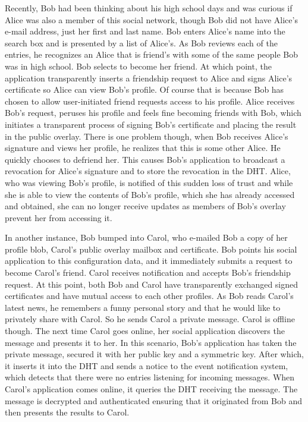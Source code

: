 \documentclass[conference]{IEEEtran}
\begin{document}
Recently, Bob had been thinking about his high school days and was curious if
Alice was also a member of this social network, though Bob did not have Alice's
e-mail address, just her first and last name.  Bob enters Alice's name into the
search box and is presented by a list of Alice's.  As Bob reviews each of the
entries, he recognizes an Alice that is friend's with some of the same people
Bob was in high school.  Bob selects to become her friend.  At which point, the
application transparently inserts a friendship request to Alice and signs Alice's
certificate so Alice can view Bob's profile.  Of course that is because Bob has
chosen to allow user-initiated friend requests access to his profile.  Alice
receives Bob's request, peruses his profile and feels fine becoming friends with
Bob, which initiates a transparent process of signing Bob's certificate and
placing the result in the public overlay.  There is one problem though, when
Bob receives Alice's signature and views her profile, he realizes that this
is some other Alice.  He quickly chooses to defriend her.  This causes Bob's
application to broadcast a revocation for Alice's signature and to store the
revocation in the DHT.  Alice, who was viewing Bob's profile, is notified of
this sudden loss of trust and while she is able to view the contents of Bob's
profile, which she has already accessed and obtained, she can no longer
receive updates as members of Bob's overlay prevent her from accessing it.

In another instance, Bob bumped into Carol, who e-mailed Bob a copy of her
profile blob, Carol's public overlay mailbox and certificate.  Bob points his
social application to this configuration data, and it immediately submits a
request to become Carol's friend.  Carol receives notification and accepts
Bob's friendship request.  At this point, both Bob and Carol have transparently
exchanged signed certificates and have mutual access to each other profiles.
As Bob reads Carol's latest news, he remembers a funny personal story and that
he would like to privately share with Carol.  So he sends Carol a private
message.  Carol is offline though.  The next time Carol goes online, her social
application discovers the message and presents it to her.  In this scenario,
Bob's application has taken the private message, secured it with her public key
and a symmetric key.  After which, it inserts it into the DHT and sends a notice
to the event notification system, which detects that there were no entries
listening for incoming messages.  When Carol's application comes online, it
queries the DHT receiving the message.  The message is decrypted and
authenticated ensuring that it originated from Bob and then presents the results
to Carol.
\end{document}
